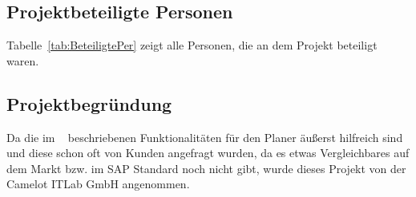 \subsection{Projektbeteiligte Personen} 
\label{sec:Projektbeteiligte Personen}
Tabelle~\ref{tab:BeteiligtePer} zeigt alle Personen, die an dem Projekt beteiligt waren.

\subsection{Projektbegründung} 
\label{sec:Projektbegruendung}
Da die im ~ beschriebenen Funktionalitäten für den Planer äußerst hilfreich sind und diese schon oft von Kunden angefragt wurden, da es etwas Vergleichbares auf dem Markt bzw. im SAP Standard noch nicht gibt, wurde dieses Projekt von der Camelot ITLab GmbH angenommen. 